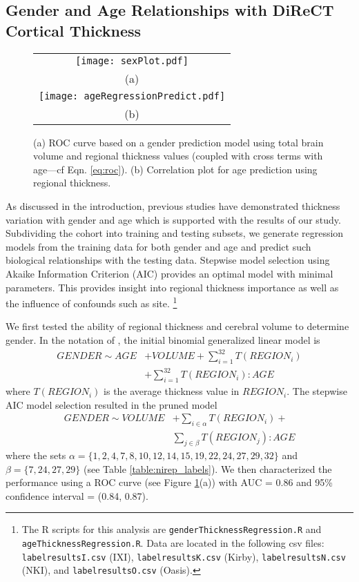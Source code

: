 \subsection{Gender and Age Relationships with DiReCT Cortical Thickness}

\begin{figure}[htb]
  \centering
  \begin{tabular}{c}
  \texttt{[image: sexPlot.pdf]} \\
  (a) \\
  \texttt{[image: ageRegressionPredict.pdf]} \\
  (b) 
  \end{tabular}
  \caption{(a) ROC curve based on a gender prediction model using total brain volume and regional thickness values (coupled with cross terms with age---cf Eqn. \ref{eq:roc}).  
  (b) Correlation plot for age prediction using regional thickness.
  }
  \label{fig:sexROC}
\end{figure}

As discussed in the introduction, previous studies have demonstrated 
thickness variation with gender and age which is supported with
the results of our study.  Subdividing the cohort into training and
testing subsets, we generate regression models from the training data
for both gender and age and predict such biological relationships with 
the testing data. Stepwise model selection using Akaike Information Criterion
(AIC) provides an optimal model with minimal parameters.  This provides 
insight into regional thickness importance as well
as the influence of confounds such as site.%
\footnote{
The R scripts for this analysis are {\tt genderThicknessRegression.R} and
{\tt ageThicknessRegression.R}.  Data are located in the following csv files: 
{\tt labelresultsI.csv} (IXI), 
{\tt labelresultsK.csv} (Kirby),
{\tt labelresultsN.csv} (NKI), and
{\tt labelresultsO.csv} (Oasis).
}

We first tested the ability of regional thickness and cerebral volume to determine
gender.
In the notation of \cite{wilkinson1973}, the initial binomial 
generalized linear model is
\begin{align}
  GENDER \sim AGE &+ VOLUME + \sum_{i=1}^{32} T(REGION_{i}) \\ \nonumber
              &+\sum_{i=1}^{32} T(REGION_{i}):AGE
\end{align}
where $T(REGION_{i})$ is the average thickness value in $REGION_{i}$.
The stepwise AIC model selection resulted in the pruned model
\begin{align}
  \label{eq:roc}
  GENDER \sim VOLUME &+ \sum_{i \in \alpha} T(REGION_i) + \\ \nonumber 
                    & \sum_{j \in \beta} T(REGION_j):AGE
\end{align}
where the sets $\alpha = \{1,2,4,7,8,10,12,14,15,19,22,24,27,29,32\}$ and $\beta = \{7,24,27,29\}$ (see Table \ref{table:nirep_labels}).  We then characterized the performance using a ROC curve (see Figure \ref{fig:sexROC}(a)) with AUC = 0.86 and 95\% confidence interval = (0.84, 0.87). 
   
